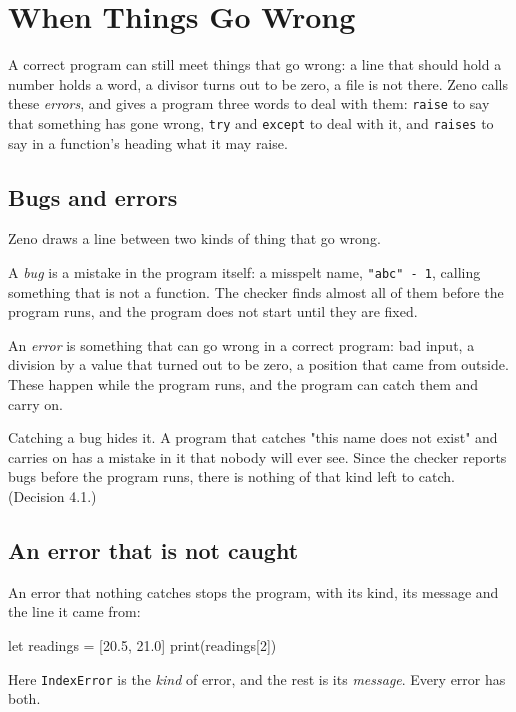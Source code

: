 \chapter{When Things Go Wrong}\label{ch-errors}

A correct program can still meet things that go wrong: a line that
should hold a number holds a word, a divisor turns out to be zero, a
file is not there. Zeno calls these \emph{errors}, and gives a program
three words to deal with them: \verb|raise| to say that something has
gone wrong, \verb|try| and \verb|except| to deal with it, and
\verb|raises| to say in a function's heading what it may raise.

\section{Bugs and errors}

Zeno draws a line between two kinds of thing that go wrong.

A \emph{bug} is a mistake in the program itself: a misspelt name,
\verb|"abc" - 1|, calling something that is not a function. The
checker finds almost all of them before the program runs, and the
program does not start until they are fixed.

An \emph{error} is something that can go wrong in a correct program:
bad input, a division by a value that turned out to be zero, a
position that came from outside. These happen while the program runs,
and the program can catch them and carry on.

\begin{why}
Catching a bug hides it. A program that catches "this name does not
exist" and carries on has a mistake in it that nobody will ever see.
Since the checker reports bugs before the program runs, there is
nothing of that kind left to catch. (Decision 4.1.)
\end{why}

\section{An error that is not caught}

An error that nothing catches stops the program, with its kind, its
message and the line it came from:

\begin{zeno}[fails=yes]
let readings = [20.5, 21.0]
print(readings[2])
\end{zeno}

Here \verb|IndexError| is the \emph{kind} of error, and the rest is
its \emph{message}. Every error has both.

